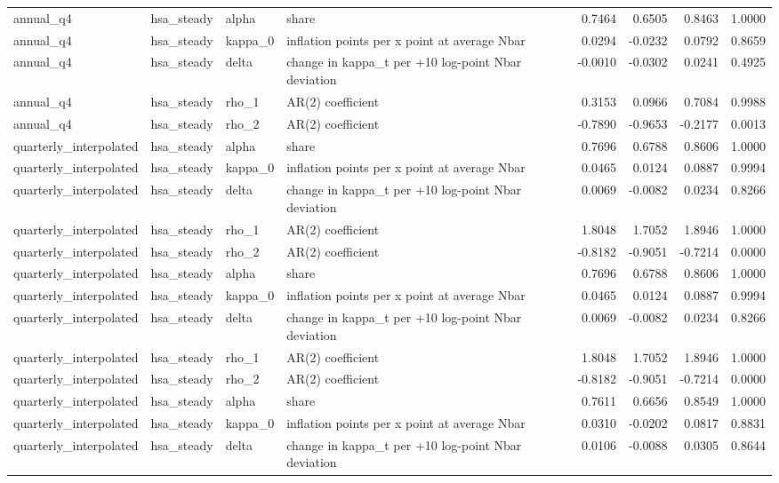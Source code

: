 \begin{tabular}{llllrrrr}
annual\_q4 & hsa\_steady & alpha & share & 0.7464 & 0.6505 & 0.8463 & 1.0000 \\
annual\_q4 & hsa\_steady & kappa\_0 & inflation points per x point at average Nbar & 0.0294 & -0.0232 & 0.0792 & 0.8659 \\
annual\_q4 & hsa\_steady & delta & change in kappa\_t per +10 log-point Nbar deviation & -0.0010 & -0.0302 & 0.0241 & 0.4925 \\
annual\_q4 & hsa\_steady & rho\_1 & AR(2) coefficient & 0.3153 & 0.0966 & 0.7084 & 0.9988 \\
annual\_q4 & hsa\_steady & rho\_2 & AR(2) coefficient & -0.7890 & -0.9653 & -0.2177 & 0.0013 \\
quarterly\_interpolated & hsa\_steady & alpha & share & 0.7696 & 0.6788 & 0.8606 & 1.0000 \\
quarterly\_interpolated & hsa\_steady & kappa\_0 & inflation points per x point at average Nbar & 0.0465 & 0.0124 & 0.0887 & 0.9994 \\
quarterly\_interpolated & hsa\_steady & delta & change in kappa\_t per +10 log-point Nbar deviation & 0.0069 & -0.0082 & 0.0234 & 0.8266 \\
quarterly\_interpolated & hsa\_steady & rho\_1 & AR(2) coefficient & 1.8048 & 1.7052 & 1.8946 & 1.0000 \\
quarterly\_interpolated & hsa\_steady & rho\_2 & AR(2) coefficient & -0.8182 & -0.9051 & -0.7214 & 0.0000 \\
quarterly\_interpolated & hsa\_steady & alpha & share & 0.7696 & 0.6788 & 0.8606 & 1.0000 \\
quarterly\_interpolated & hsa\_steady & kappa\_0 & inflation points per x point at average Nbar & 0.0465 & 0.0124 & 0.0887 & 0.9994 \\
quarterly\_interpolated & hsa\_steady & delta & change in kappa\_t per +10 log-point Nbar deviation & 0.0069 & -0.0082 & 0.0234 & 0.8266 \\
quarterly\_interpolated & hsa\_steady & rho\_1 & AR(2) coefficient & 1.8048 & 1.7052 & 1.8946 & 1.0000 \\
quarterly\_interpolated & hsa\_steady & rho\_2 & AR(2) coefficient & -0.8182 & -0.9051 & -0.7214 & 0.0000 \\
quarterly\_interpolated & hsa\_steady & alpha & share & 0.7611 & 0.6656 & 0.8549 & 1.0000 \\
quarterly\_interpolated & hsa\_steady & kappa\_0 & inflation points per x point at average Nbar & 0.0310 & -0.0202 & 0.0817 & 0.8831 \\
quarterly\_interpolated & hsa\_steady & delta & change in kappa\_t per +10 log-point Nbar deviation & 0.0106 & -0.0088 & 0.0305 & 0.8644 \\

\end{tabular}
